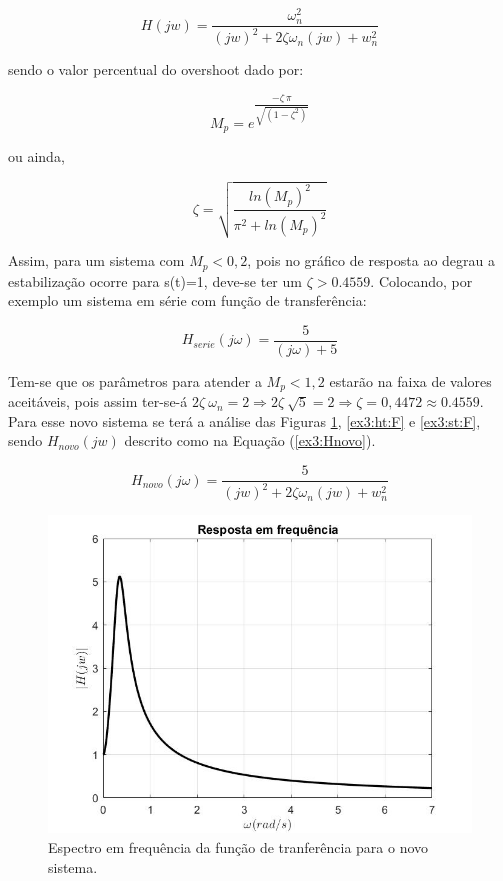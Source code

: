 \documentclass[a4paper,12pt,oneside,openany,table,xcdraw]{article}
\begin{document}
$$H(jw) =\dfrac{\omega_n ^2}{(jw)^2 + 2 \zeta \omega_n (jw)+ w_n ^2} $$

\vspace{0.3cm}
sendo o valor percentual do overshoot dado por: 

$$ M_p = e^{\dfrac{-\zeta\ \pi}{\sqrt{(1-\zeta^2)}}}$$

ou ainda,

$$ \zeta = \sqrt{\dfrac{ln(M_p)^2}{\pi^2 + ln(M_p)^2}}$$

\vspace{0.45cm}
Assim, para um sistema com $M_p< 0,2$, pois no gráfico de resposta ao degrau a estabilização ocorre para s(t)=1, deve-se ter um $\zeta > 0.4559$. Colocando, por exemplo um sistema em série com função de transferência:


$$H_{serie}(j\omega) = \dfrac{5}{(j\omega)+5}$$

\vspace{0.8cm}
Tem-se que os parâmetros para atender a $M_p< 1,2$ estarão na faixa de valores aceitáveis, pois assim ter-se-á $2\zeta\ \omega_n=2 \Rightarrow 2\zeta\ \sqrt{5}=2 \Rightarrow \zeta = 0,4472 \approx 0.4559$. Para esse novo sistema se terá a análise das Figuras \ref{ex3:Hjw:F}, \ref{ex3:ht:F} e \ref{ex3:st:F}, sendo $H_{novo}(jw)$ descrito como na Equação (\ref{ex3:Hnovo}).

\vspace{0.3cm}
\begin{equation} \label{ex3:Hnovo}
H_{novo}(j\omega) = \dfrac{5}{(jw)^2 + 2 \zeta \omega_n (jw) + w_n ^2}
\end{equation}

\vspace{2cm}
\begin{figure}[H]
\centering
\includegraphics[width=14cm]{ex3-Hjwf}
\caption{Espectro em frequência da função de tranferência para o novo sistema.}
\label{ex3:Hjw:F}
\end{figure}
\end{document}
